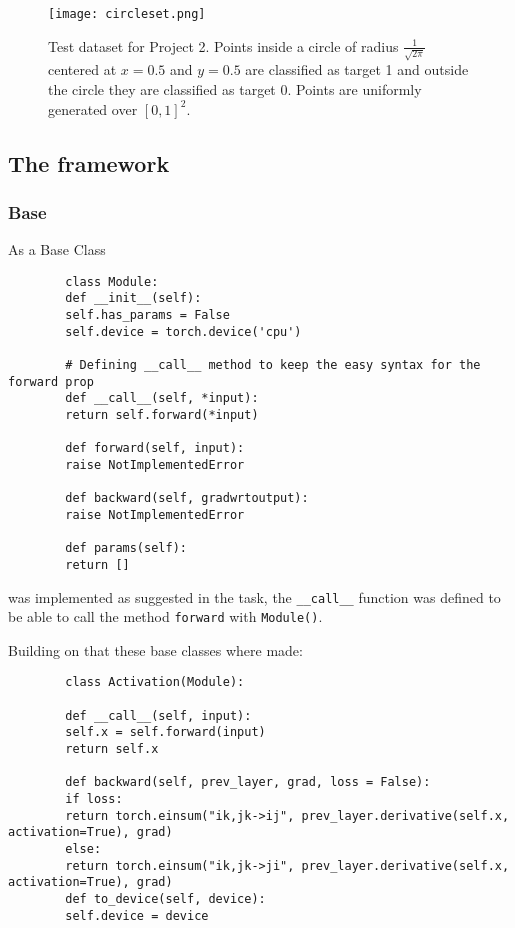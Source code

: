 \documentclass[11pt,english]{article}
\begin{document}
	\begin{figure}
		\centering
		\texttt{[image: 
			circleset.png]}
		\caption{Test dataset for Project 2. Points inside a circle of radius $\frac{1}{\sqrt{2 \pi}}$ centered at $x=0.5$ and $y=0.5$ are classified as target 1 and outside the circle they are classified as target 0. Points are uniformly generated over $[0, 1]^2$.}
		\label{fig:circleset}
	\end{figure}  
	
	\subsection{The framework} \label{ssec:framework}
	
	\subsubsection{Base}
	
	As a Base Class 
	
	\begin{lstlisting}
		class Module:
		def __init__(self):
		self.has_params = False
		self.device = torch.device('cpu')
		
		# Defining __call__ method to keep the easy syntax for the forward prop
		def __call__(self, *input):
		return self.forward(*input)
		
		def forward(self, input):
		raise NotImplementedError
		
		def backward(self, gradwrtoutput):
		raise NotImplementedError
		
		def params(self):
		return []
	\end{lstlisting}
	
	was implemented as suggested in the task, the \lstinline|__call__| function was defined to be able to call the method \lstinline|forward| with \lstinline|Module()|.
	
	Building on that these base classes where made: 
	
	\begin{lstlisting}
		class Activation(Module):
		
		def __call__(self, input):
		self.x = self.forward(input)
		return self.x
		
		def backward(self, prev_layer, grad, loss = False):
		if loss:
		return torch.einsum("ik,jk->ij", prev_layer.derivative(self.x, activation=True), grad) 
		else:
		return torch.einsum("ik,jk->ji", prev_layer.derivative(self.x, activation=True), grad) 
		def to_device(self, device):
		self.device = device
	\end{lstlisting}
	
\end{document}
